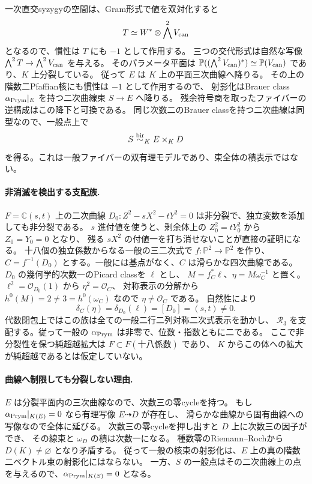 一次直交syzygyの空間は、Gram形式で値を双対化すると
\[
 T\simeq W^*\otimes\bigwedge^2V_{\rm can}
\]
となるので、慣性は $T$ にも $-1$ として作用する。
三つの交代形式は自然な写像
$\bigwedge^2T\to\bigwedge^2V_{\rm can}$ を与える。
そのパラメータ平面は
$\mathbb P((\bigwedge^2V_{\rm can})^*)\simeq\mathbb P(V_{\rm can})$ であり、$K$ 上分裂している。
従って $E$ は $K$ 上の平面三次曲線へ降りる。
その上の階数二Pfaffian核にも慣性は $-1$ として作用するので、
射影化はBrauer class $\alpha_{\rm Prym}|_E$ を持つ二次曲線束 $S\to E$ へ降りる。
残余符号商を取ったファイバーの逆構成はこの降下と可換である。
同じ次数二のBrauer classを持つ二次曲線は同型なので、一般点上で
\begin{equation}\label{eq:notes-prym-product-v27}
 S\mathrel{\overset{\mathrm{bir}}{\sim}}_K E\times_KD
\end{equation}
を得る。これは一般ファイバーの双有理モデルであり、束全体の積表示ではない。

\paragraph{非消滅を検出する支配族.}
$F=\mathbb C(s,t)$ 上の二次曲線
$D_0:Z^2-sX^2-tY^2=0$ は非分裂で、独立変数を添加しても非分裂である。
$s$ 進付値を使うと、剰余体上の $Z_0^2=tY_0^2$ から $Z_0=Y_0=0$ となり、
残る $sX^2$ の付値一を打ち消せないことが直接の証明になる。
十八個の独立係数からなる一般の三二次式で $f:\mathbb P^2\to\mathbb P^2$ を作り、
$C=f^{-1}(D_0)$ とする。一般には基点がなく、$C$ は滑らかな四次曲線である。
$D_0$ の幾何学的次数一のPicard classを $\ell$ とし、
$M=f_C^*\ell$、$\eta=M\omega_C^{-1}$ と置く。
$\ell^2=\mathcal O_{D_0}(1)$ から $\eta^2=\mathcal O_C$、
対称表示の分解から $h^0(M)=2\ne3=h^0(\omega_C)$ なので $\eta\ne\mathcal O_C$ である。
自然性により
\[
 \delta_C(\eta)=\delta_{D_0}(\ell)=[D_0]=(s,t)\ne0.
\]
代数閉包上ではこの族は全ての一般二行二列対称二次式表示を動かし、
$\mathcal R_3$ を支配する。従って一般の $\alpha_{\rm Prym}$ は非零で、位数・指数ともに二である。
ここで非分裂性を保つ純超越拡大は $F\subset F(\text{十八係数})$ であり、
$K$ からこの体への拡大が純超越であるとは仮定していない。

\paragraph{曲線へ制限しても分裂しない理由.}
$E$ は分裂平面内の三次曲線なので、次数三の零cycleを持つ。
もし $\alpha_{\rm Prym}|_{K(E)}=0$ なら有理写像 $E\dashrightarrow D$ が存在し、
滑らかな曲線から固有曲線への写像なので全体に延びる。
次数三の零cycleを押し出すと $D$ 上に次数三の因子ができ、
その線束と $\omega_D$ の積は次数一になる。
種数零のRiemann--Rochから $D(K)\ne\varnothing$ となり矛盾する。
従って一般の核束の射影化は、$E$ 上の真の階数二ベクトル束の射影化にはならない。
一方、$S$ の一般点はその二次曲線上の点を与えるので、$\alpha_{\rm Prym}|_{K(S)}=0$ となる。

